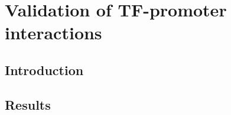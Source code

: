 \documentclass[../main.tex]{subfiles}
\begin{document}
\chapter{Validation of TF-promoter interactions}
\label{chapter4}
\section{Introduction}
\label{chapter4:introduction}

\section{Results}
\label{chapter4:results}
\end{document}
